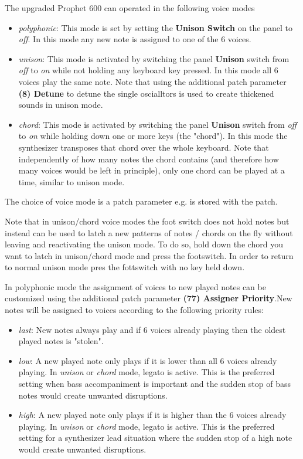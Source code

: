 The upgraded Prophet 600 can operated in the following voice modes

\begin{itemize}
  \setlength\itemsep{0cm}
  \item \textit{polyphonic}: This mode is set by setting the \textbf{Unison Switch} on the panel to \textit{off}. In this mode any new note is assigned to one of the 6 voices. 
  \item \textit{unison}: This mode is activated by switching the panel \textbf{Unison} switch from \textit{off} to \textit{on} while not holding any keyboard key pressed. In this mode all 6 voices play the same note. Note that using the additional patch parameter \textbf{(8) Detune} to detune the single oscialltors is used to create thickened sounds in unison mode.
  \item \textit{chord}: This mode is activated by switching the panel \textbf{Unison} switch from \textit{off} to \textit{on} while holding down one or more keys (the "chord"). In this mode the synthesizer transposes that chord over the whole keyboard. Note that independently of how many notes the chord contains (and therefore how many voices would be left in principle), only one chord can be played at a time, similar to unison mode.
\end{itemize} 

The choice of voice mode is a patch parameter e.g. is stored with the patch.

Note that in unison/chord voice modes the foot switch does not hold notes but instead can be used to latch a new patterns of notes / chords on the fly without leaving and reactivating the unison mode. To do so, hold down the chord you want to latch in unison/chord mode and press the footswitch. In order to return to normal unison mode pres the fottswitch with no key held down. 

In polyphonic mode the assignment of voices to new played notes can be customized using the additional patch parameter \textbf{(77) Assigner Priority}.New notes will be assigned to voices according to the following priority rules:

\begin{itemize}
  \setlength\itemsep{0cm}
  \item \textit{last}: New notes always play and if 6 voices already playing then the oldest played notes is "stolen".
  \item \textit{low}: A new played note only plays if it is lower than all 6 voices already playing. In \textit{unison} or \textit{chord} mode, legato is active. This is the preferred setting when bass accompaniment is important and the sudden stop of bass notes would create unwanted disruptions. 
  \item \textit{high}: A new played note only plays if it is higher than the 6 voices already playing. In \textit{unison} or \textit{chord} mode, legato is active. This is the preferred setting for a synthesizer lead situation where the sudden stop of a high note would create unwanted disruptions. 
\end{itemize}

